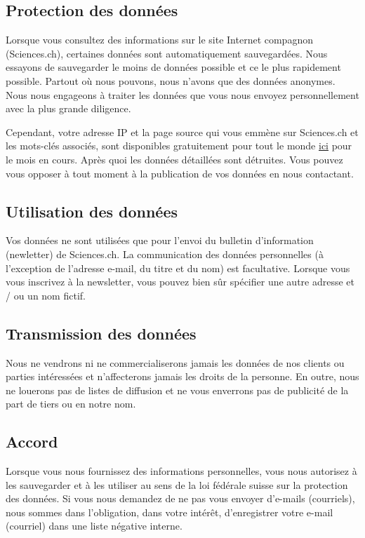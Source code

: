 	\pagebreak
	\subsection{Protection des donn\'ees}
	Lorsque vous consultez des informations sur le site Internet compagnon (Sciences.ch), certaines donn\'ees sont automatiquement sauvegard\'ees. Nous essayons de sauvegarder le moins de donn\'ees possible et ce le plus rapidement possible. Partout où nous pouvons, nous n'avons que des donn\'ees anonymes. Nous nous engageons à traiter les donn\'ees que vous nous envoyez personnellement avec la plus grande diligence.

	Cependant, votre adresse IP et la page source qui vous emmène sur Sciences.ch et les mots-cl\'es associ\'es, sont disponibles gratuitement pour tout le monde \href{http://www.sciences.ch/htmlfr/php/cedstat/references.php}{ici} pour le mois en cours. Après quoi les donn\'ees d\'etaill\'ees sont d\'etruites. Vous pouvez vous opposer à tout moment à la publication de vos donn\'ees en nous contactant.

	\subsection{Utilisation des donn\'ees}
	Vos donn\'ees ne sont utilis\'ees que pour l'envoi du bulletin d'information (newletter) de Sciences.ch. La communication des donn\'ees personnelles (à l'exception de l'adresse e-mail, du titre et du nom) est facultative. Lorsque vous vous inscrivez à la newsletter, vous pouvez bien sûr sp\'ecifier une autre adresse et / ou un nom fictif.

	\subsection{Transmission des donn\'ees}
	Nous ne vendrons ni ne commercialiserons jamais les donn\'ees de nos clients ou parties int\'eress\'ees et n'affecterons jamais les droits de la personne. En outre, nous ne louerons pas de listes de diffusion et ne vous enverrons pas de publicit\'e de la part de tiers ou en notre nom.

	\subsection{Accord}
	Lorsque vous nous fournissez des informations personnelles, vous nous autorisez à les sauvegarder et à les utiliser au sens de la loi f\'ed\'erale suisse sur la protection des donn\'ees. Si vous nous demandez de ne pas vous envoyer d'e-mails (courriels), nous sommes dans l'obligation, dans votre int\'erêt, d'enregistrer votre e-mail (courriel) dans une liste n\'egative interne.
	
